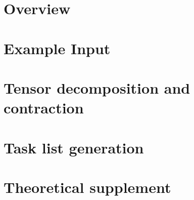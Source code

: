 \documentclass[12pt]{report}
\begin{document}
\tableofcontents

\chapter*{Overview}


\chapter{Example Input}


\chapter{Tensor decomposition and contraction}


\chapter{Task list generation}


\chapter{Theoretical supplement}


{}

\end{document}
